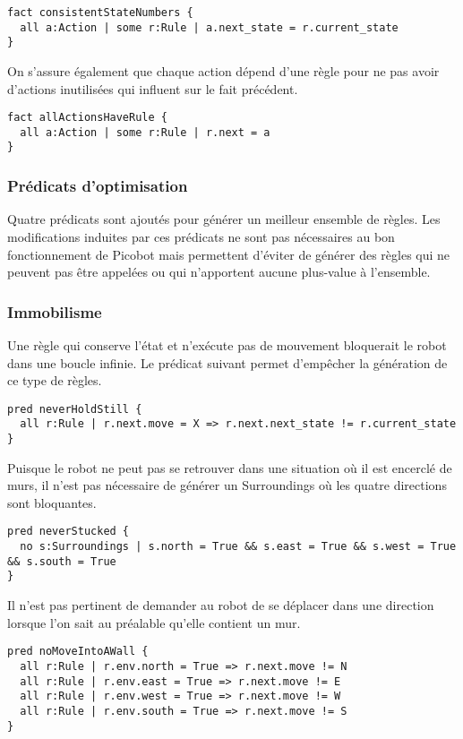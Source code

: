 \documentclass{article}
\begin{document}
\begin{lstlisting}
fact consistentStateNumbers {
  all a:Action | some r:Rule | a.next_state = r.current_state 
}
\end{lstlisting}

On s’assure également que chaque action dépend d’une règle pour ne pas avoir d’actions inutilisées qui influent sur le fait précédent.

\begin{lstlisting}
fact allActionsHaveRule {
  all a:Action | some r:Rule | r.next = a
}
\end{lstlisting}

\subsubsection{Prédicats d’optimisation}
Quatre prédicats sont ajoutés pour générer un meilleur ensemble de règles. Les modifications induites par ces prédicats ne sont pas nécessaires au bon fonctionnement de Picobot mais permettent d'éviter de générer des règles qui ne peuvent pas être appelées ou qui n'apportent aucune plus-value à l'ensemble.

\subsubsection*{Immobilisme}
Une règle qui conserve l’état et n'exécute pas de mouvement bloquerait le robot dans une boucle infinie. Le prédicat suivant permet d'empêcher la génération de ce type de règles.

\begin{lstlisting}
pred neverHoldStill {
  all r:Rule | r.next.move = X => r.next.next_state != r.current_state
}
\end{lstlisting}
Puisque le robot ne peut pas se retrouver dans une situation où il est encerclé de murs, il n'est pas nécessaire de générer un Surroundings où les quatre directions sont bloquantes.
\begin{lstlisting}
pred neverStucked {
  no s:Surroundings | s.north = True && s.east = True && s.west = True && s.south = True
}
\end{lstlisting}

Il n'est pas pertinent de demander au robot de se déplacer dans une direction lorsque l'on sait au préalable qu'elle contient un mur. 

\begin{lstlisting}
pred noMoveIntoAWall {
  all r:Rule | r.env.north = True => r.next.move != N
  all r:Rule | r.env.east = True => r.next.move != E
  all r:Rule | r.env.west = True => r.next.move != W
  all r:Rule | r.env.south = True => r.next.move != S
}
\end{lstlisting}
\end{document}
